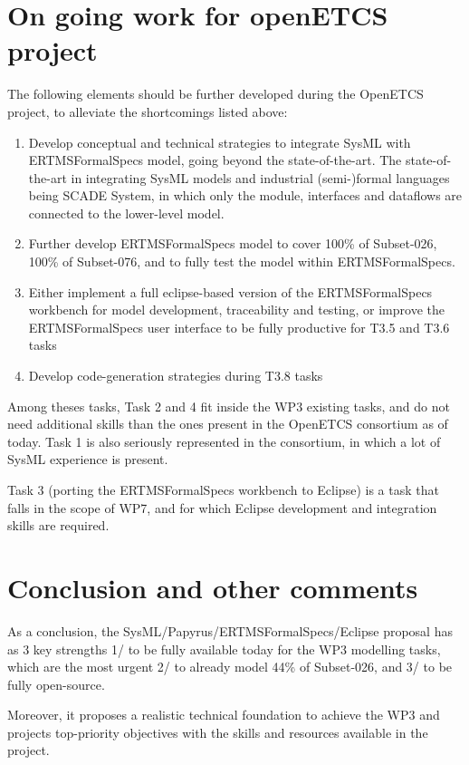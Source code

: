 \section{On going work for openETCS project}

The following elements should be further developed during the OpenETCS project, to alleviate the shortcomings listed above:

\begin{enumerate}
  \item Develop conceptual and technical strategies to integrate SysML with ERTMSFormalSpecs model, going beyond the state-of-the-art. The state-of-the-art in integrating SysML models and industrial (semi-)formal languages being SCADE System, in which only the module, interfaces and dataflows are connected to the lower-level model.
	\item Further develop ERTMSFormalSpecs model to cover 100\% of Subset-026, 100\% of Subset-076, and to fully test the model within ERTMSFormalSpecs. 
	\item Either implement a full eclipse-based version of the ERTMSFormalSpecs workbench for model development, traceability and testing, or improve the ERTMSFormalSpecs user interface to be fully productive for T3.5 and T3.6 tasks
	\item Develop code-generation strategies during T3.8 tasks
\end{enumerate}

Among theses tasks, Task 2 and 4 fit inside the WP3 existing tasks, and do not need additional skills than the ones present in the OpenETCS consortium as of today. Task 1 is also seriously represented in the consortium, in which a lot of SysML experience is present. 

Task 3 (porting the ERTMSFormalSpecs workbench to Eclipse) is a task that falls in the scope of WP7, and for which Eclipse development and integration skills are required.

\section{Conclusion and other comments}

As a conclusion, the SysML/Papyrus/ERTMSFormalSpecs/Eclipse proposal has as 3 key strengths 1/ to be fully available today for the WP3 modelling tasks, which are the most urgent 2/ to already model 44\% of Subset-026, and 3/ to be fully open-source. 

Moreover, it proposes a realistic technical foundation to achieve the WP3 and projects top-priority objectives with the skills and resources available in the project.
